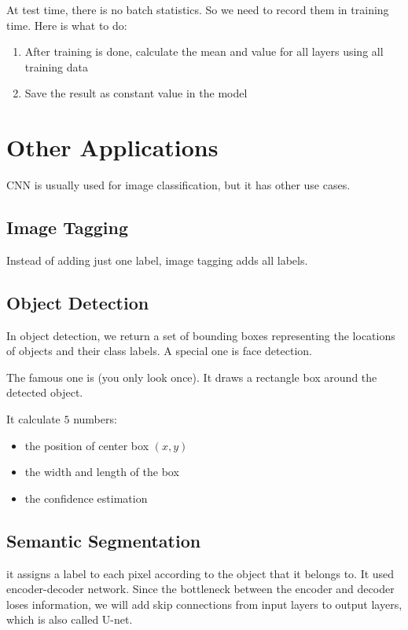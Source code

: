 At test time, there is no batch statistics. So we need to record them in training time. Here is what to do:
\begin{enumerate}
    \item After training is done, calculate the mean and value for all layers using all training data
    \item Save the result as constant value in the model
\end{enumerate}


\section{Other Applications}

CNN is usually used for image classification, but it has other use cases.

\subsection{Image Tagging}

Instead of adding just one label, image tagging adds all labels.

\subsection{Object Detection}

In object detection, we return a set of bounding boxes representing the locations of objects and their class labels. A special one is face detection.

The famous one is  (you only look once). It draws a rectangle box around the detected object. 

It calculate $5$ numbers:
\begin{itemize}
    \item the position of center box $(x,y)$
    \item the width and length of the box
    \item the confidence estimation
\end{itemize}

\subsection{Semantic Segmentation}

it assigns a label to each pixel according to the object that it belongs to. It used encoder-decoder network. Since the bottleneck between the encoder and decoder loses information, we will add skip connections from input layers to output layers, which is also called U-net.


